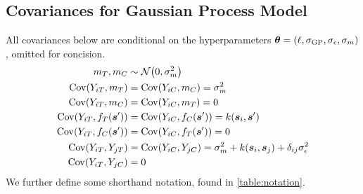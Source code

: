 


\begin{appendices}

\section{Covariances for Gaussian Process Model}
\label{sec:covariances}
All covariances below are conditional on the hyperparameters \(\bm{\theta} = \left\lparen\ell,\sigma_{\mathrm{GP}}, \sigma_{\epsilon}, \sigma_{m}\right\rparen\), omitted for concision.
\begin{equation}
    \begin{split}
        m_\treat, m_\ctrol   &\sim \normal\del{0,\sigmamu^2} \\
        \cov(Y_{i\treat},m_\treat)  &= \cov(Y_{i\ctrol},m_\ctrol) = \sigmamu^2 \\
        \cov(Y_{i\treat},m_\ctrol)  &= \cov(Y_{i\ctrol},m_\treat)  = 0 \\
        \cov\del{Y_{i\treat}, f_{\treat}(\svec')} &= \cov\del{Y_{i\ctrol}, f_{\ctrol}(\svec')} = k(\svec_i,\svec') \\
        \cov\del{Y_{i\treat}, f_{\ctrol}(\svec')} &= \cov\del{Y_{i\ctrol}, f_{\treat}(\svec')} = 0 \\
        \cov(Y_{i\treat},Y_{j\treat}) &= \cov(Y_{i\ctrol},Y_{j\ctrol}) = \sigmamu^2 + k(\svec_i,\svec_j) + \delta_{ij}\sigman^2 \\
        \cov(Y_{i\treat},Y_{j\ctrol}) &= 0
    \end{split}
    \label{eq:covariances}
\end{equation}
We further define some shorthand notation, found in \autoref{table:notation}.


\end{appendices}
